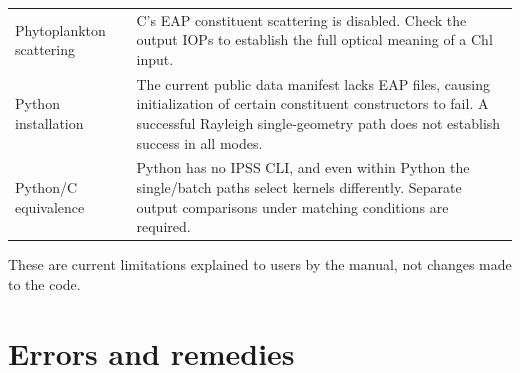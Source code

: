 {\begin{longtable}{@{}>{\raggedright\arraybackslash}p{}>{\raggedright\arraybackslash}p{}@{}}
Phytoplankton scattering & C's EAP constituent scattering is disabled. Check the output IOPs to establish the full optical meaning of a Chl input. \\
Python installation & The current public data manifest lacks EAP files, causing initialization of certain constituent constructors to fail. A successful Rayleigh single-geometry path does not establish success in all modes. \\
Python/C equivalence & Python has no IPSS CLI, and even within Python the single/batch paths select kernels differently. Separate output comparisons under matching conditions are required. \\
\end{longtable}
}

These are current limitations explained to users by the manual, not changes made to the code.

\section{Errors and remedies}
\label{sec:auto:07_validation_notes:3}

